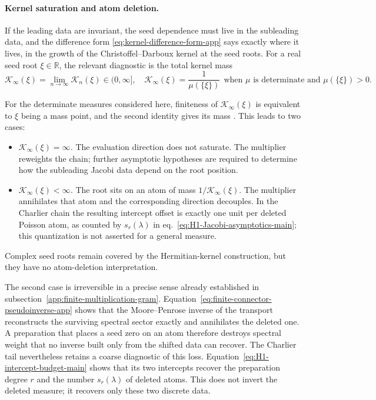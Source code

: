 \documentclass[a4paper,11pt]{article}
\theoremstyle{definition}
\theoremstyle{remark}
\newcommand{\RR}{\mathbb R}
\begin{document}
\paragraph{Kernel saturation and atom deletion.}
\label{subsec:kernel-mass-dichotomy}

If the leading data are invariant, the seed dependence must live in the subleading data, and the
difference form \eqref{eq:kernel-difference-form-app} says exactly where it lives, in the growth of the
Christoffel--Darboux kernel at the seed roots. For a real
seed root $\xi\in\RR$, the relevant diagnostic is the total kernel mass
\begin{equation}
   \mathcal K_\infty(\xi)=\lim_{n\to\infty}\mathcal K_n(\xi)\in(0,\infty],
   \quad
      \mathcal K_\infty(\xi)=\frac{1}{\mu(\{\xi\})}\ \ \text{when }\mu\text{ is determinate and }\mu(\{\xi\})>0.
   \label{eq:kernel-mass-dichotomy}
\end{equation}

For the determinate measures considered here, finiteness of
$\mathcal K_\infty(\xi)$ is equivalent to $\xi$ being a mass point, and the second identity gives
its mass \cite{SimonCDK}. This leads to two cases:
\begin{itemize}[leftmargin=1.6em,itemsep=1pt]
\item \emph{$\mathcal K_\infty(\xi)=\infty$.} The evaluation direction does not saturate. The
multiplier reweights the chain; further asymptotic hypotheses are required to determine how the
subleading Jacobi data depend on the root position.
\item \emph{$\mathcal K_\infty(\xi)<\infty$.} The root sits on an atom of mass
$1/\mathcal K_\infty(\xi)$. The multiplier annihilates that atom and the corresponding direction
decouples. In the Charlier chain the resulting intercept offset is exactly one unit per deleted
Poisson atom, as counted by $s_r(\lambda)$ in
eq.~\eqref{eq:H1-Jacobi-asymptotics-main}; this quantization is not asserted for a general measure.
\end{itemize}
Complex seed roots remain covered by the Hermitian-kernel construction, but they have no
atom-deletion interpretation.

The second case is irreversible in a precise sense already established in
subsection~\ref{app:finite-multiplication-gram}.  Equation~\eqref{eq:finite-connector-pseudoinverse-app}
shows that the Moore--Penrose inverse of the transport reconstructs the surviving spectral sector
exactly and annihilates the deleted one.  A preparation that places a seed zero on an atom
therefore destroys spectral weight that no inverse built only from the shifted data can recover.
The Charlier tail nevertheless retains a coarse diagnostic of this loss.
Equation~\eqref{eq:H1-intercept-budget-main} shows that its two intercepts recover the preparation
degree $r$ and the number $s_r(\lambda)$ of deleted atoms.  This does not invert the deleted
measure; it recovers only these two discrete data.
\end{document}
